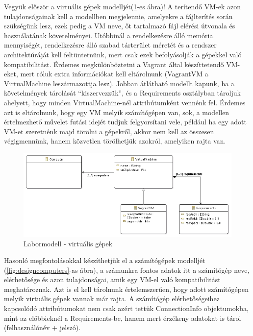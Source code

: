 Vegyük először a virtuális gépek modelljét(\ref{fig:designvm}-es ábra)! A terítendő VM-ek azon tulajdonságainak kell a modellben megjelennie, amelyekre a fájlterítés során szükségünk lesz, ezek pedig a VM neve, őt tartalmazó fájl elérési útvonala és használatának követelményei. Utóbbinál a rendelkezésre álló memória mennyiségét, rendelkezésre álló szabad tárterület méretét és a rendszer architektúráját kell feltüntetnünk, mert csak ezek befolyásolják a gépekkel való kompatibilitást. Érdemes megkülönböztetni a Vagrant által készíttetendő VM-eket, mert róluk extra információkat kell eltárolnunk (VagrantVM a VirtualMachine leszármazottja lesz). Jobban átlátható modellt kapunk, ha a követelmények tárolását ``kiszervezzük'', és a Requirements osztályban tároljuk ahelyett, hogy minden VirtualMachine-nél attribútumként vennénk fel. Érdemes azt is eltárolnunk, hogy egy VM melyik számítógépen van, sok, a modellen értelmezhető művelet futási idejét tudjuk felgyorsítani vele, például ha egy adott VM-et szeretnénk majd törölni a gépekről, akkor nem kell az összesen végigmennünk, hanem közvetlen törölhetjük azokról, amelyiken rajta van.

\begin{figure}[ht]
	\centering
	\includegraphics[width=130mm, keepaspectratio]{figures/design_vm.png}
	\caption{Labormodell - virtuális gépek}
	\label{fig:designvm}
\end{figure}

Hasonló megfontolásokkal készíthetjük el a számítógépek modelljét (\ref{fig:designcomputers}-as ábra), a számunkra fontos adatok itt a számítógép neve, elérhetősége és azon tulajdonságai, amik egy VM-el való kompatibilitást meghatároznak. Azt is el kell tárolnunk értelemszerűen, hogy adott számítógépen melyik virtuális gépek vannak már rajta. A számítógép elérhetőségeihez kapcsolódó attribútumokat nem csak azért tettük ConnectionInfo objektumokba, mint az előbbieknél a Requirements-be, hanem mert érzékeny adatokat is tárol (felhasználónév + jelszó).

